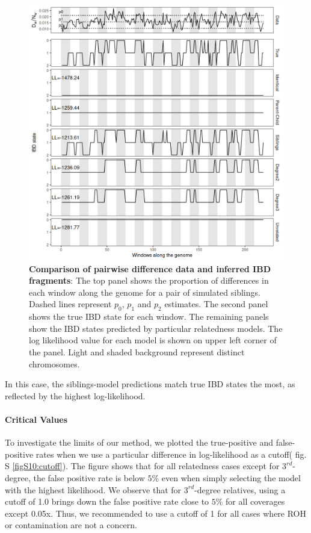 \documentclass[12pt, letterpaper]{article}
\begin{document}
\begin{figure}[h!]
    \includegraphics[width=16cm]{plots/plotimg/IBDplot.png}
    \centering
    \caption{\textbf{Comparison of pairwise difference data  and inferred IBD fragments}:  The top panel shows the proportion of differences in each window along the genome for a pair of simulated siblings. Dashed lines represent $p_0$, $p_1$ and $p_2$ estimates. The second panel shows the true IBD state for each window. The remaining panels show the IBD states predicted by particular relatedness models. The log likelihood value for each model is shown on upper left corner of the panel. Light and shaded background represent distinct chromosomes.}
    \label{fig1:ibd}
\end{figure}

In this case, the siblings-model predictions match true IBD states the most, as reflected by the highest log-likelihood. 


\paragraph{Critical Values}
 To investigate the limits of our method, we plotted the true-positive and false-positive rates when we use a particular difference in log-likelihood as a cutoff( fig. S \ref{figS10:cutoff}). The figure shows that for all relatedness cases except for $3^{rd}$-degree, the false positive rate is below $5\%$ even when simply selecting the model with the highest likelihood. We observe that for $3^{rd}$-degree relatives, using a cutoff of 1.0 brings down the false positive rate close to $5\%$ for all coverages except 0.05x. Thus, we  recommended to use a cutoff of 1 for all cases where ROH or contamination are not a concern.
\end{document}
